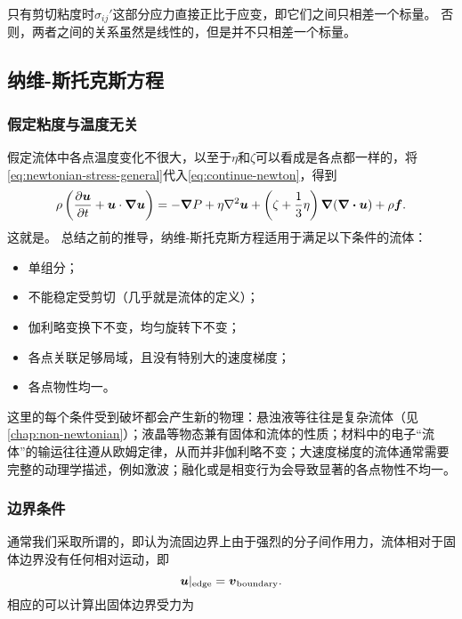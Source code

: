 只有剪切粘度时$\sigma_{ij}'$这部分应力直接正比于应变，即它们之间只相差一个标量。
否则，两者之间的关系虽然是线性的，但是并不只相差一个标量。

\subsection{纳维-斯托克斯方程}

\subsubsection{假定粘度与温度无关}

假定流体中各点温度变化不很大，以至于$\eta$和$\zeta$可以看成是各点都一样的，将\eqref{eq:newtonian-stress-general}代入\eqref{eq:continue-newton}，得到
\begin{equation}
    \rho \left( \pdv{\vb*{u}}{t} + \vb*{u} \cdot \grad \vb*{u} \right) = - \grad{P} + \eta \laplacian \vb*{u} + \left( \zeta + \frac{1}{3} \eta \right) \grad{(\div{\vb*{u}})} + \rho \vb*{f}.
    \label{eq:ns-eq}
\end{equation}
这就是。
总结之前的推导，纳维-斯托克斯方程适用于满足以下条件的流体：
\begin{itemize}
    \item 单组分；
    \item 不能稳定受剪切（几乎就是流体的定义）；
    \item 伽利略变换下不变，均匀旋转下不变；
    \item 各点关联足够局域，且没有特别大的速度梯度；
    \item 各点物性均一。
\end{itemize}
这里的每个条件受到破坏都会产生新的物理：悬浊液等往往是复杂流体（见\autoref{chap:non-newtonian}）；液晶等物态兼有固体和流体的性质；材料中的电子“流体”的输运往往遵从欧姆定律，从而并非伽利略不变；大速度梯度的流体通常需要完整的动理学描述，例如激波；融化或是相变行为会导致显著的各点物性不均一。

\subsubsection{边界条件}

通常我们采取所谓的，即认为流固边界上由于强烈的分子间作用力，流体相对于固体边界没有任何相对运动，即
\begin{equation}
    \vb*{u}|_\text{edge} = \vb*{v}_\text{boundary}.
\end{equation}
相应的可以计算出固体边界受力为

